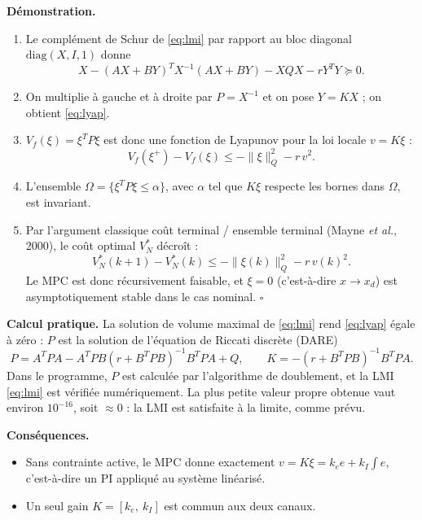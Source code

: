 \documentclass[11pt,a4paper]{article}
\begin{document}
\textbf{Démonstration.}
\begin{enumerate}
\item Le complément de Schur de \eqref{eq:lmi} par rapport au bloc diagonal $\mathrm{diag}(X,I,1)$ donne
\[
X-(AX+BY)^TX^{-1}(AX+BY)-XQX-rY^TY\succeq0 .
\]
\item On multiplie à gauche et à droite par $P=X^{-1}$ et on pose $Y=KX$ ; on obtient \eqref{eq:lyap}.
\item $V_f(\xi)=\xi^TP\xi$ est donc une fonction de Lyapunov pour la loi locale $v=K\xi$ :
\[
V_f(\xi^+)-V_f(\xi)\le-\|\xi\|_Q^2-r\,v^2 .
\]
\item L'ensemble $\Omega=\{\xi^TP\xi\le\alpha\}$, avec $\alpha$ tel que $K\xi$ respecte les bornes dans $\Omega$, est invariant.
\item Par l'argument classique coût terminal / ensemble terminal (Mayne \emph{et al.}, 2000), le coût optimal $V_N^\ast$ décroît :
\[
V_N^\ast(k+1)-V_N^\ast(k)\le-\|\xi(k)\|_Q^2-r\,v(k)^2 .
\]
Le MPC est donc récursivement faisable, et $\xi=0$ (c'est-à-dire $x\to x_d$) est asymptotiquement stable dans le cas nominal. \hfill$\square$
\end{enumerate}

\textbf{Calcul pratique.} La solution de volume maximal de \eqref{eq:lmi} rend \eqref{eq:lyap} égale à zéro : $P$ est la solution de l'équation de Riccati discrète (DARE)
\[
P=A^TPA-A^TPB(r+B^TPB)^{-1}B^TPA+Q,\qquad K=-(r+B^TPB)^{-1}B^TPA .
\]
Dans le programme, $P$ est calculée par l'algorithme de doublement, et la LMI \eqref{eq:lmi} est vérifiée numériquement. La plus petite valeur propre obtenue vaut environ $10^{-16}$, soit $\approx0$ : la LMI est satisfaite à la limite, comme prévu.

\textbf{Conséquences.}
\begin{itemize}
\item Sans contrainte active, le MPC donne exactement $v=K\xi=k_e e+k_I\int e$, c'est-à-dire un PI appliqué au système linéarisé.
\item Un seul gain $K=[k_e,\ k_I]$ est commun aux deux canaux.
\end{itemize}
\end{document}
